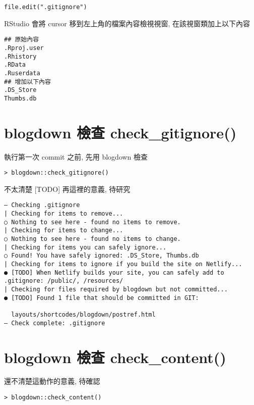 \documentclass[
]{book}
\begin{document}
\begin{verbatim}
file.edit(".gitignore")
\end{verbatim}

RStudio 會將 cursor 移到左上角的檔案內容檢視視窗, 在該視窗類加上以下內容

\begin{verbatim}
## 原始內容 
.Rproj.user
.Rhistory
.RData
.Ruserdata
## 增加以下內容
.DS_Store
Thumbs.db
\end{verbatim}

\hypertarget{blogdown-ux6aa2ux67e5-check_gitignore}{%
\section{blogdown 檢查 check\_gitignore()}\label{blogdown-ux6aa2ux67e5-check_gitignore}}

執行第一次 commit 之前, 先用 blogdown 檢查

\begin{verbatim}
> blogdown::check_gitignore()
\end{verbatim}

不太清楚 {[}TODO{]} 再這裡的意義, 待研究

\begin{verbatim}
― Checking .gitignore
| Checking for items to remove...
○ Nothing to see here - found no items to remove.
| Checking for items to change...
○ Nothing to see here - found no items to change.
| Checking for items you can safely ignore...
○ Found! You have safely ignored: .DS_Store, Thumbs.db
| Checking for items to ignore if you build the site on Netlify...
● [TODO] When Netlify builds your site, you can safely add to .gitignore: /public/, /resources/
| Checking for files required by blogdown but not committed...
● [TODO] Found 1 file that should be committed in GIT:

  layouts/shortcodes/blogdown/postref.html
― Check complete: .gitignore
\end{verbatim}

\hypertarget{blogdown-ux6aa2ux67e5-check_content}{%
\section{blogdown 檢查 check\_content()}\label{blogdown-ux6aa2ux67e5-check_content}}

還不清楚這動作的意義, 待確認

\begin{verbatim}
> blogdown::check_content()
\end{verbatim}
\end{document}
